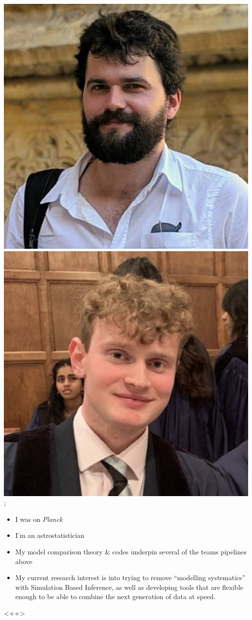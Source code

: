 \documentclass[aspectratio=169]{beamer}
\begin{document}
\begin{frame}
{        \includegraphics[width=0.09\textheight]{people/will_handley.jpg}%
        \includegraphics[width=0.09\textheight]{people/will_templeton.jpg}%
    };
    \begin{itemize}
        \item I was on \textit{Planck}
        \item I'm an astrostatistician
        \item My model comparison theory \& codes underpin several of the teams pipelines above
        \item My current research interest is into trying to remove ``modelling systematics'' with Simulation Based Inference, as well as developing tools that are flexible enough to be able to combine the next generation of data at speed.
    \end{itemize}<++>
\end{frame}
\end{document}
